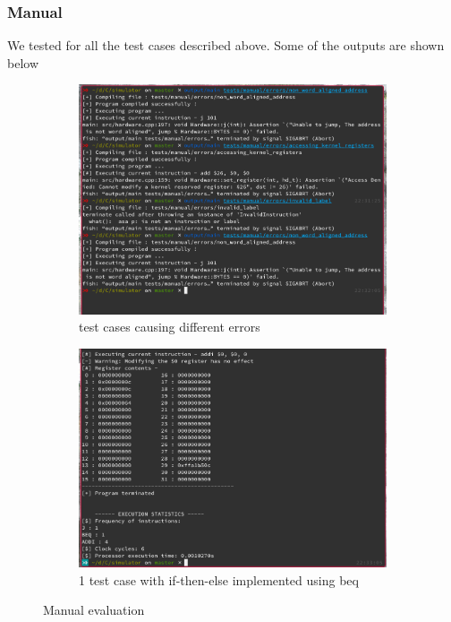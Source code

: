 \documentclass[hidelinks,12pt]{article}
\begin{document}
\subsubsection{Manual}
We tested for all the test cases described above.
Some of the outputs are shown below
\begin{figure}[H]
    \centering
    \begin{subfigure}[t]{\textwidth}
        \centering
        \includegraphics[scale=0.4]{manual_errors.png}
        \caption{test cases causing different errors}
    \end{subfigure}
    \begin{subfigure}[t]{\textwidth}
        \centering
        \includegraphics[scale=0.4]{manual_conditional.png}
        \caption{1 test case with if-then-else implemented using beq}
    \end{subfigure}
    \caption{Manual evaluation}
\end{figure}
\end{document}
